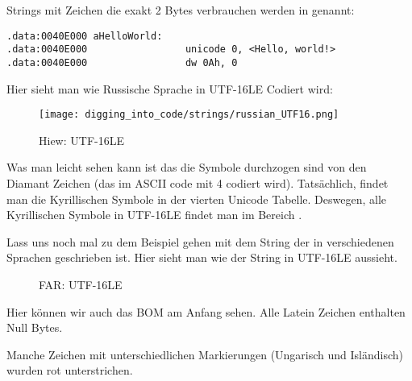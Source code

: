 Strings mit Zeichen die exakt 2 Bytes verbrauchen werden  in \IDA genannt:

\begin{lstlisting}[style=customasmx86]
.data:0040E000 aHelloWorld:
.data:0040E000                 unicode 0, <Hello, world!>
.data:0040E000                 dw 0Ah, 0
\end{lstlisting}

Hier sieht man wie Russische Sprache in UTF-16LE Codiert wird:

\begin{figure}[H]
\centering
\texttt{[image: digging\_into\_code/strings/russian\_UTF16.png]}
\caption{Hiew: UTF-16LE}
\end{figure}

Was man leicht sehen kann ist das die Symbole durchzogen sind von den Diamant Zeichen (das im ASCII code mit 4 codiert wird).
Tats\"achlich, findet man die Kyrillischen Symbole in der vierten Unicode Tabelle.
Deswegen, alle Kyrillischen Symbole in UTF-16LE findet man im Bereich .

Lass uns noch mal zu dem Beispiel gehen mit dem String der in verschiedenen Sprachen geschrieben ist.
Hier sieht man wie der String in UTF-16LE aussieht. 

\begin{figure}[H]
\centering
{}
\caption{FAR: UTF-16LE}
\end{figure}

Hier k\"onnen wir auch das \ac{BOM} am Anfang sehen. 
Alle Latein Zeichen enthalten Null Bytes.

Manche Zeichen mit unterschiedlichen Markierungen (Ungarisch und Isl\"andisch) wurden rot unterstrichen.



